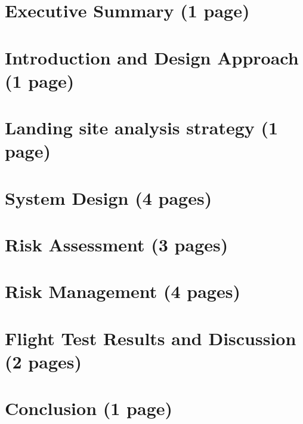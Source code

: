 \documentclass{article}
\begin{document}
\newpage



\newpage
\section{Executive Summary (1 page)}


\newpage
\section{Introduction and Design Approach (1 page)}


\newpage
\section{Landing site analysis strategy (1 page)}


\newpage
\section{System Design (4 pages)}


\newpage
\section{Risk Assessment (3 pages)}


\newpage
\section{Risk Management (4 pages)}


\newpage
\section{Flight Test Results and Discussion (2 pages)}


\newpage
\section{Conclusion (1 page)}

\end{document}
